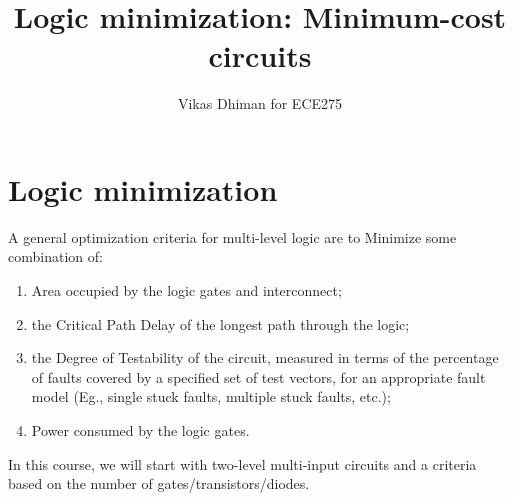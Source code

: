 \documentclass{article}
\title{Logic minimization: Minimum-cost circuits}
\author{Vikas Dhiman for ECE275}
\newtheorem{example}{Example}
\newcommand{\bx}{\bar{x}}
\begin{document}
\maketitle

% 
% 

\section{Logic minimization}

A general optimization criteria for multi-level logic are to Minimize
some combination of:
\begin{enumerate}
\item Area occupied by the logic gates and interconnect;
\item the Critical Path Delay of the longest path through the logic;
\item the Degree of Testability of the circuit, measured in terms of the percentage
of faults covered by a specified set of test vectors, for an appropriate fault model
(Eg., single stuck faults, multiple stuck faults, etc.);
\item Power consumed by the logic gates.
\end{enumerate}

In this course, we will start with two-level multi-input circuits and a criteria
based on the number of gates/transistors/diodes.
\end{document}
